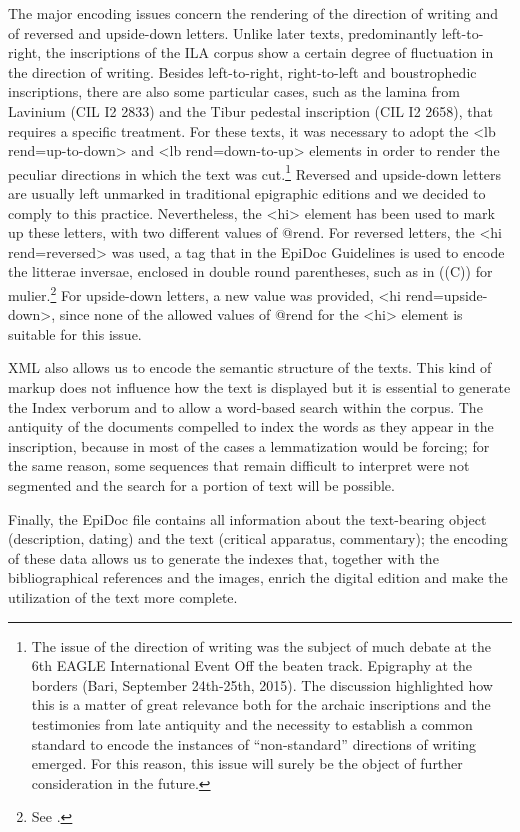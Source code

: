 \documentclass[amsthm,ebook]{saparticle}
\begin{document}
The major encoding issues concern the rendering of the direction of writing and of reversed and upside-down letters.
Unlike later texts, predominantly left-to-right, the inscriptions of the ILA corpus show a certain degree of
fluctuation in the direction of writing. Besides left-to-right, right-to-left and boustrophedic inscriptions, there are
also some particular cases, such as the lamina from Lavinium (CIL I2 2833) and the Tibur pedestal inscription (CIL I2
2658), that requires a specific treatment. For these texts, it was necessary to adopt the {\textless}lb
rend={\textquotedbl}up-to-down{\textquotedbl}{\textgreater} and {\textless}lb
rend={\textquotedbl}down-to-up{\textquotedbl}{\textgreater} elements in order to render the peculiar directions in
which the text was cut.\footnote{The issue of the direction of writing was the subject of much debate at the 6th EAGLE
International Event Off the beaten track. Epigraphy at the borders (Bari, September 24th{}-25th, 2015). The discussion
highlighted how this is a matter of great relevance both for the archaic inscriptions and the testimonies from late
antiquity and the necessity to establish a common standard to encode the instances of “non-standard” directions of
writing emerged. For this reason, this issue will surely be the object of further consideration in the future.}
Reversed and upside-down letters are usually left unmarked in traditional epigraphic editions and we decided to comply
to this practice. Nevertheless, the {\textless}hi{\textgreater} element has been used to mark up these letters, with
two different values of @rend. For reversed letters, the {\textless}hi
rend={\textquotedbl}reversed{\textquotedbl}{\textgreater} was used, a tag that in the EpiDoc Guidelines is used to
encode the litterae inversae, enclosed in double round parentheses, such as in ((C)) for mulier.\footnote{See \citet[1722]{panciera_i_2006}.} For upside-down letters, a new value was provided, {\textless}hi
rend={\textquotedbl}upside-down{\textquotedbl}{\textgreater}, since none of the allowed values of @rend for the
{\textless}hi{\textgreater} element is suitable for this issue.

XML also allows us to encode the semantic structure of the texts. This kind of markup does not influence how the text is
displayed but it is essential to generate the Index verborum and to allow a word-based search within the corpus. The
antiquity of the documents compelled to index the words as they appear in the inscription, because in most of the cases
a lemmatization would be forcing; for the same reason, some sequences that remain difficult to interpret were not
segmented and the search for a portion of text will be possible. 

Finally, the EpiDoc file contains all information about the text-bearing object (description, dating) and the text
(critical apparatus, commentary); the encoding of these data allows us to generate the indexes that, together with the
bibliographical references and the images, enrich the digital edition and make the utilization of the text more
complete. 

\nocite{colonna_iscrizioni_2007}


\end{document}
